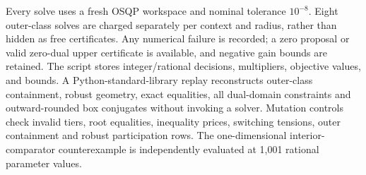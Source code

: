 Every solve uses a fresh OSQP workspace and nominal tolerance $10^{-8}$. Eight outer-class solves are charged separately per context and radius, rather than hidden as free certificates. Any numerical failure is recorded; a zero proposal or valid zero-dual upper certificate is available, and negative gain bounds are retained. The script stores integer/rational decisions, multipliers, objective values, and bounds. A Python-standard-library replay reconstructs outer-class containment, robust geometry, exact equalities, all dual-domain constraints and outward-rounded box conjugates without invoking a solver. Mutation controls check invalid tiers, root equalities, inequality prices, switching tensions, outer containment and robust participation rows. The one-dimensional interior-comparator counterexample is independently evaluated at 1,001 rational parameter values.
